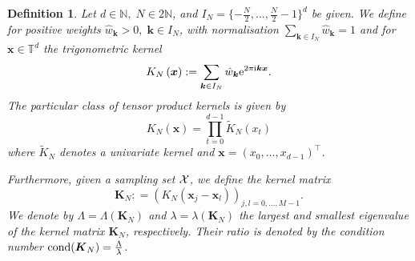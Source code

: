 \documentclass[11pt,a4paper,bibtotoc]{scrartcl}
\def\N{\mathbb{N}}
\def\T{\mathbb{T}}
\def\ti{\mbox{\scriptsize{\rm i}}}
\newcommand{\eip}[1]{{\rm e}^{ 2\pi{\ti} #1}}
\newcommand{\zb}[1]{\ensuremath{\boldsymbol{#1}}}
\newcommand{\cond}{{\rm cond}}
\newcommand{\indexset}{{I_N}}
\newtheorem{definition}[theorem]{Definition}
\newenvironment{Definition}{\goodbreak \begin{definition}\rm}{\end{definition}}
\numberwithin{equation}{section}
\numberwithin{table}{section}
\numberwithin{figure}{section}
\begin{document}
\begin{Definition}  \label{def:kernel}
  Let $d\in\N,\;N\in 2\N$, and $I_N=\{-\frac{N}{2},\hdots,\frac{N}{2}-1\}^d$
  be given. 
  We define for positive weights $\hat w_{\zb k}>0,\; \zb k \in
  \indexset$, with normalisation $\sum_{\zb k\in I_N} \hat w_{\zb k}=1$ and for $\zb x
  \in \T^d$ the trigonometric {\em kernel}
  \begin{equation*}
    K_N \left(\zb x\right):=\sum\limits_{\zb k \in \indexset} \hat w_{\zb k}
    \eip{\zb k \zb x}.
  \end{equation*}
  The particular class of {\em tensor product kernels} is given by
  \begin{equation*}
    K_N\left(\zb x\right)=\prod\limits_{t=0}^{d-1}
    \tilde K_N\left(x_t\right)
  \end{equation*}
  where $\tilde K_N$ denotes a univariate kernel and $\zb
  x=(x_0,\hdots,x_{d-1})^{\top}$.

  Furthermore, given a sampling set ${\cal X}$, we define the {\em kernel
  matrix}
  \begin{equation}\label{def:K}
    \zb K_N: = \left(K_N (\zb x_j-\zb x_l) \right)_{j,l=0,\ldots,M-1}.
  \end{equation}
  We denote by $\Lambda=\Lambda\left(\zb K_N\right)$ and
  $\lambda=\lambda\left(\zb K_N\right)$ the largest and smallest eigenvalue of 
  the kernel matrix $\zb K_N$, respectively.
  Their ratio is denoted by the condition number $\cond(\zb K_N)=
  \frac{\Lambda}{\lambda}$.
\end{Definition}
\end{document}
